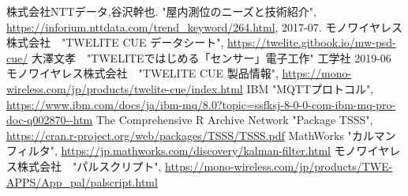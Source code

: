 \renewcommand{\bibname}{参考文献}
\begin{thebibliography}{8}
 株式会社NTTデータ,谷沢幹也. "屋内測位のニーズと技術紹介", \url{https://inforium.nttdata.com/trend\_keyword/264.html}, 2017-07.
 モノワイヤレス株式会社　"TWELITE CUE データシート", \url{https://twelite.gitbook.io/mw-psd-cue/}
大澤文孝　"TWELITEではじめる「センサー」電子工作" 工学社 2019-06
モノワイヤレス株式会社　"TWELITE CUE 製品情報", \url{https://mono-wireless.com/jp/products/twelite-cue/index.html}
 IBM "MQTTプロトコル", \url{https://www.ibm.com/docs/ja/ibm-mq/8.0?topic=ssfksj-8-0-0-com-ibm-mq-pro-doc-q002870--htm}
 The Comprehensive R Archive Network "Package TSSS", \url{https://cran.r-project.org/web/packages/TSSS/TSSS.pdf}
 MathWorks "カルマンフィルタ", \url{https://jp.mathworks.com/discovery/kalman-filter.html}
 モノワイヤレス株式会社　"パルスクリプト", \url{https://mono-wireless.com/jp/products/TWE-APPS/App_pal/palscript.html}
\end{thebibliography}
